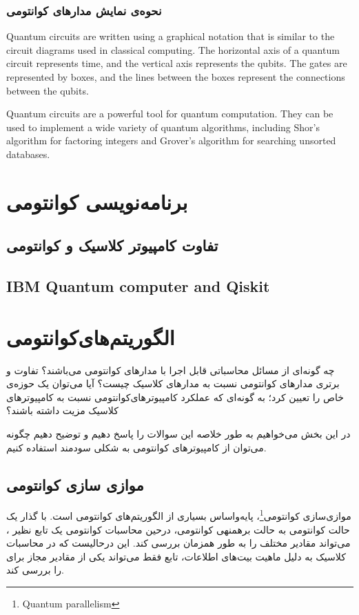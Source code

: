 \documentclass{book}
\begin{document}
\subsection{نحوه‌ی نمایش مدار‌های کوانتومی}

Quantum circuits are written using a graphical notation that is similar to the circuit diagrams used in classical computing. The horizontal axis of a quantum circuit represents time, and the vertical axis represents the qubits. The gates are represented by boxes, and the lines between the boxes represent the connections between the qubits.

Quantum circuits are a powerful tool for quantum computation. They can be used to implement a wide variety of quantum algorithms, including Shor's algorithm for factoring integers and Grover's algorithm for searching unsorted databases.

\chapter{برنامه‌نویسی کوانتومی}
\section{تفاوت کامپیوتر کلاسیک و کوانتومی}
\section{IBM Quantum computer and Qiskit}

\chapter{الگوریتم‌های‌کوانتومی‌}


چه گونه‌ای از مسائل محاسباتی قابل اجرا با مدارهای کوانتومی می‌باشند؟ 
تفاوت و برتری مدار‌های کوانتومی نسبت به مدار‌های کلاسیک چیست؟
آیا می‌توان یک حوزه‌ی خاص را تعیین کرد؛ به گونه‌ای که عملکرد کامپیوترهای‌‌کوانتومی نسبت به کامپیوتر‌های کلاسیک مزیت داشته باشند؟

در این بخش می‌خواهیم به طور خلاصه این سوالات را پاسخ دهیم و توضیح دهیم چگونه می‌توان از کامپیوتر‌های کوانتومی به شکلی سودمند استفاده کنیم.

\section{موازی سازی کوانتومی}

موازی‌سازی کوانتومی\footnote{Quantum parallelism}، پایه‌واساس بسیاری از الگوریتم‌های کوانتومی است. با گذار یک حالت کوانتومی به حالت برهمنهی کوانتومی، درحین محاسبات کوانتومی یک تابع نظیر ، می‌تواند مقادیر مختلف  را به طور همزمان بررسی کند. این درحالیست که در محاسبات کلاسیک به دلیل ماهیت بیت‌های اطلاعات، تابع  فقط می‌تواند یکی از مقادیر مجاز برای  را بررسی کند.
\end{document}
